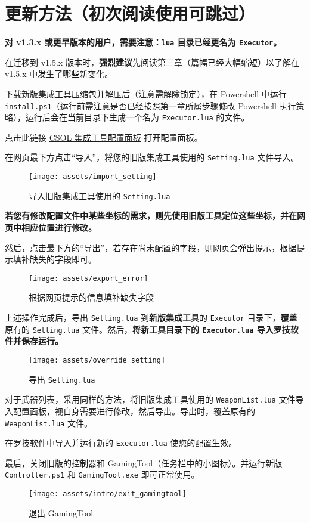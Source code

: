 \section{更新方法（初次阅读使用可跳过）}
\label{how_to_update}

\textbf{\color{red}对 v1.3.x 或更早版本的用户，需要注意：\lstinline{lua} 目录已经更名为 \lstinline{Executor}。}

在迁移到 v1.5.x 版本时，\textbf{\color{red}强烈建议}先阅读第三章（篇幅已经大幅缩短）以了解在 v1.5.x 中发生了哪些新变化。

下载新版集成工具压缩包并解压后（注意需解除锁定），在 Powershell 中运行 \lstinline{install.ps1}（运行前需注意是否已经按照第一章所属步骤修改 Powershell 执行策略），运行后会在当前目录下生成一个名为 \lstinline{Executor.lua} 的文件。

点击此链接 \href{https://www.macrohard.fun/CSOL-Utilities/ConfigPanel}{CSOL 集成工具配置面板} 打开配置面板。

在网页最下方点击“导入”，将您的旧版集成工具使用的 \lstinline{Setting.lua} 文件导入。

\begin{figure}[H]
    \Centering
    \texttt{[image: assets/import\_setting]}
    \caption{导入旧版集成工具使用的 \lstinline{Setting.lua}}
\end{figure}

\textbf{\color{red}若您有修改配置文件中某些坐标的需求，则先使用旧版工具定位这些坐标，并在网页中相应位置进行修改。}

然后，点击最下方的“导出”，若存在尚未配置的字段，则网页会弹出提示，根据提示填补缺失的字段即可。

\begin{figure}[H]
    \Centering
    \texttt{[image: assets/export\_error]}
    \caption{根据网页提示的信息填补缺失字段}
\end{figure}

上述操作完成后，导出 \lstinline{Setting.lua} 到\textbf{\color{red}新版集成工具}的 \lstinline{Executor} 目录下，\textbf{\color{red}覆盖}原有的 \lstinline{Setting.lua} 文件。然后，\textbf{\color{red}将新工具目录下的 \lstinline{Executor.lua} 导入罗技软件并保存运行。}

\begin{figure}[H]
    \Centering
    \texttt{[image: assets/override\_setting]}
    \caption{导出 \lstinline{Setting.lua}}
\end{figure}

对于武器列表，采用同样的方法，将旧版集成工具使用的 \lstinline{WeaponList.lua} 文件导入配置面板，视自身需要进行修改，然后导出。导出时，覆盖原有的 \lstinline{WeaponList.lua} 文件。

在罗技软件中导入并运行新的 \lstinline{Executor.lua} 使您的配置生效。

最后，关闭旧版的控制器和 GamingTool（任务栏中的小图标）。并运行新版 \lstinline{Controller.ps1} 和 \lstinline{GamingTool.exe} 即可正常使用。

\begin{figure}[H]
    \Centering
    \texttt{[image: assets/intro/exit\_gamingtool]}
    \caption{退出 GamingTool}
\end{figure}